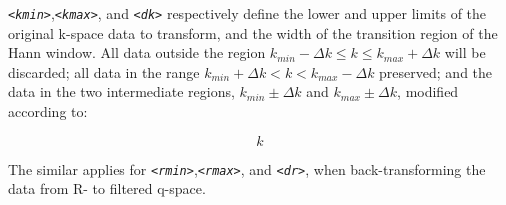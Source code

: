 \documentclass[a4paper,12pt]{report}
\begin{document}
\texttt{\emph{<kmin>}},\texttt{\emph{<kmax>}}, and \texttt{\emph{<dk>}} respectively define the lower and upper limits of the original k-space data to transform, and the width of the transition region of the Hann window. All data outside the region $k_{min} - \Delta k \le k \le k_{max} + \Delta k$ will be discarded; all data in the range $k_{min} + \Delta k < k < k_{max} - \Delta k$ preserved; and the data in the two intermediate regions, $k_{min} \pm \Delta k$ and $k_{max} \pm \Delta k$, modified according to:

\begin{equation}
k
\end{equation}

The similar applies for \texttt{\emph{<rmin>}},\texttt{\emph{<rmax>}}, and \texttt{\emph{<dr>}}, when back-transforming the data from R- to filtered q-space.
\end{document}
